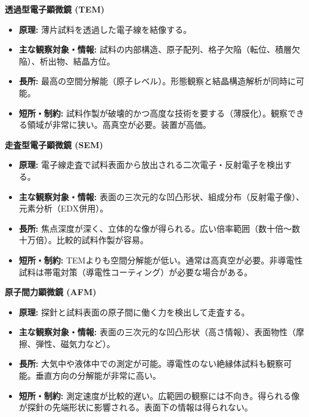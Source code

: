 \documentclass[11pt,a4paper]{ltjsarticle}
\begin{document}
\textbf{透過型電子顕微鏡 (TEM)}
\begin{itemize}
    \item \textbf{原理:} 薄片試料を透過した電子線を結像する。
    \item \textbf{主な観察対象・情報:} 試料の内部構造、原子配列、格子欠陥（転位、積層欠陥）、析出物、結晶方位。
    \item \textbf{長所:} 最高の空間分解能（原子レベル）。形態観察と結晶構造解析が同時に可能。
    \item \textbf{短所・制約:} 試料作製が破壊的かつ高度な技術を要する（薄膜化）。観察できる領域が非常に狭い。高真空が必要。装置が高価。
\end{itemize}

\textbf{走査型電子顕微鏡 (SEM)}
\begin{itemize}
    \item \textbf{原理:} 電子線走査で試料表面から放出される二次電子・反射電子を検出する。
    \item \textbf{主な観察対象・情報:} 表面の三次元的な凹凸形状、組成分布（反射電子像）、元素分析（EDX併用）。
    \item \textbf{長所:} 焦点深度が深く、立体的な像が得られる。広い倍率範囲（数十倍～数十万倍）。比較的試料作製が容易。
    \item \textbf{短所・制約:} TEMよりも空間分解能が低い。通常は高真空が必要。非導電性試料は帯電対策（導電性コーティング）が必要な場合がある。
\end{itemize}

\textbf{原子間力顕微鏡 (AFM)}
\begin{itemize}
    \item \textbf{原理:} 探針と試料表面の原子間に働く力を検出して走査する。
    \item \textbf{主な観察対象・情報:} 表面の三次元的な凹凸形状（高さ情報）、表面物性（摩擦、弾性、磁気力など）。
    \item \textbf{長所:} 大気中や液体中での測定が可能。導電性のない絶縁体試料も観察可能。垂直方向の分解能が非常に高い。
    \item \textbf{短所・制約:} 測定速度が比較的遅い。広範囲の観察には不向き。得られる像が探針の先端形状に影響される。表面下の情報は得られない。
\end{itemize}
\end{document}
